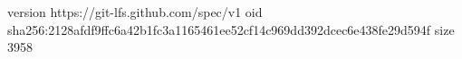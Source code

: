 version https://git-lfs.github.com/spec/v1
oid sha256:2128afdf9ffc6a42b1fc3a1165461ee52cf14c969dd392dcec6e438fe29d594f
size 3958
